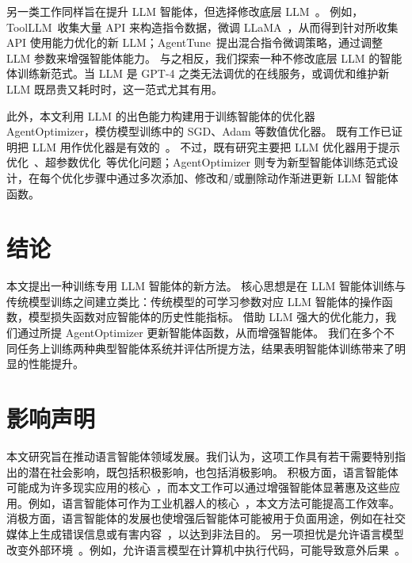 \documentclass{article}
\begin{document}
另一类工作同样旨在提升 LLM 智能体，但选择修改底层 LLM~\cite{patil2023gorilla,qin2023toolllm,zeng2023agenttuning}。
例如，ToolLLM~\cite{qin2023toolllm}收集大量 API 来构造指令数据，微调 LLaMA~\cite{touvron2023llama}，从而得到针对所收集 API 使用能力优化的新 LLM；AgentTune~\cite{zeng2023agenttuning}提出混合指令微调策略，通过调整 LLM 参数来增强智能体能力。
与之相反，我们探索一种不修改底层 LLM 的智能体训练新范式。当 LLM 是 GPT-4 之类无法调优的在线服务，或调优和维护新 LLM 既昂贵又耗时时，这一范式尤其有用。

此外，本文利用 LLM 的出色能力构建用于训练智能体的优化器 AgentOptimizer，模仿模型训练中的 SGD、Adam 等数值优化器。
既有工作已证明把 LLM 用作优化器是有效的~\cite{yang2023large,zhang2023using}。
不过，既有研究主要把 LLM 优化器用于提示优化~\cite{yang2023large}、超参数优化~\cite{zhang2023using}等优化问题；AgentOptimizer 则专为新型智能体训练范式设计，在每个优化步骤中通过多次添加、修改和/或删除动作渐进更新 LLM 智能体函数。

\section{结论}

本文提出一种训练专用 LLM 智能体的新方法。
核心思想是在 LLM 智能体训练与传统模型训练之间建立类比：传统模型的可学习参数对应 LLM 智能体的操作函数，模型损失函数对应智能体的历史性能指标。
借助 LLM 强大的优化能力，我们通过所提 AgentOptimizer 更新智能体函数，从而增强智能体。
我们在多个不同任务上训练两种典型智能体系统并评估所提方法，结果表明智能体训练带来了明显的性能提升。

\section*{影响声明}

本文研究旨在推动语言智能体领域发展。我们认为，这项工作具有若干需要特别指出的潜在社会影响，既包括积极影响，也包括消极影响。
积极方面，语言智能体可能成为许多现实应用的核心~\cite{hosseini2023exploratory,cai2019hello}，而本文工作可以通过增强智能体显著惠及这些应用。例如，语言智能体可作为工业机器人的核心~\cite{zeng2023large}，本文方法可能提高工作效率。
消极方面，语言智能体的发展也使增强后智能体可能被用于负面用途，例如在社交媒体上生成错误信息或有害内容~\cite{navigli2023biases}，以达到非法目的。
另一项担忧是允许语言模型改变外部环境~\cite{tian2023evil}。例如，允许语言模型在计算机中执行代码，可能导致意外后果~\cite{liu2024empirical}。

\balance


\end{document}
